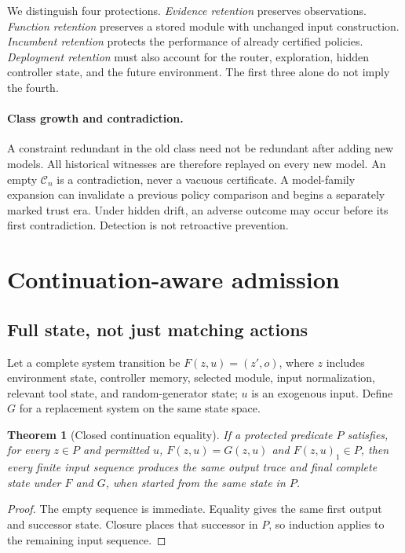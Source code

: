 \documentclass[10pt,twocolumn]{article}
\newtheorem{theorem}{Theorem}
\newcommand{\C}{\mathcal C}
\begin{document}
We distinguish four protections. \emph{Evidence retention} preserves observations.
\emph{Function retention} preserves a stored module with unchanged input
construction. \emph{Incumbent retention} protects the performance of already
certified policies. \emph{Deployment retention} must also account for the router,
exploration, hidden controller state, and the future environment. The first three
alone do not imply the fourth.

\paragraph{Class growth and contradiction.}
A constraint redundant in the old class need not be redundant after adding new
models. All historical witnesses are therefore replayed on every new model.
An empty $\C_n$ is a contradiction, never a vacuous certificate. A model-family
expansion can invalidate a previous policy comparison and begins a separately
marked trust era. Under hidden drift, an adverse outcome may occur before its
first contradiction. Detection is not retroactive prevention.

\section{Continuation-aware admission}
\subsection{Full state, not just matching actions}
Let a complete system transition be $F(z,u)=(z',o)$, where $z$ includes environment
state, controller memory, selected module, input normalization, relevant tool state,
and random-generator state; $u$ is an exogenous input. Define $G$ for a replacement
system on the same state space.

\begin{theorem}[Closed continuation equality]\label{thm:closed}
If a protected predicate $P$ satisfies, for every $z\in P$ and permitted $u$,
$F(z,u)=G(z,u)$ and $F(z,u)_1\in P$, then every finite input sequence produces
the same output trace and final complete state under $F$ and $G$, when started
from the same state in $P$.
\end{theorem}
\begin{proof}
The empty sequence is immediate. Equality gives the same first output and
successor state. Closure places that successor in $P$, so induction applies to the
remaining input sequence.
\end{proof}
\end{document}
